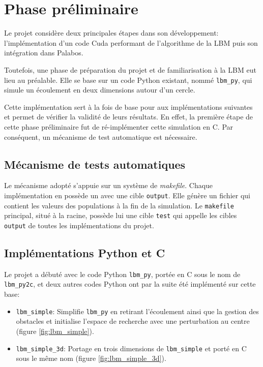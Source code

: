 \section{Phase préliminaire}
Le projet considère deux principales étapes dans son développement: l'implémentation d'un code Cuda performant de l'algorithme de la \ac{LBM} puis son intégration dans Palabos.

Toutefois, une phase de préparation du projet et de familiarisation à la \ac{LBM} eut lieu au préalable. Elle se base sur un code Python existant, nommé \texttt{lbm\_py}, qui simule un écoulement en deux dimensions autour d'un cercle. 

Cette implémentation sert à la fois de base pour aux implémentations suivantes et permet de vérifier la validité de leurs résultats. En effet, la première étape de cette phase préliminaire fut de ré-implémenter cette simulation en C. Par conséquent, un mécanisme de test automatique est nécessaire.

\subsection{Mécanisme de tests automatiques} \label{title-tests}

Le mécanisme adopté s'appuie sur un système de \textit{makefile}. Chaque implémentation en possède un avec une cible \texttt{output}. Elle génère un fichier qui contient les valeurs des populations à la fin de la simulation. Le \texttt{makefile} principal, situé à la racine, possède lui une cible \texttt{test} qui appelle les cibles \texttt{output} de toutes les implémentations du projet.

\subsection{Implémentations Python et C}  \label{title-implementation_python_C}

Le projet a débuté avec le code Python \texttt{lbm\_py}, portée en C sous le nom de \texttt{lbm\_py2c}, et deux autres codes Python ont par la suite été implémenté sur cette base:
\begin{itemize}
\item \texttt{lbm\_simple}: Simplifie \texttt{lbm\_py} en retirant l'écoulement ainsi que la gestion des obstacles et initialise l'espace de recherche avec une perturbation au centre (figure \ref{fig:lbm_simple}). 
\item \texttt{lbm\_simple\_3d}: Portage en trois dimensions de \texttt{lbm\_simple} et porté en C sous le même nom (figure \ref{fig:lbm_simple_3d}). 
\end{itemize}

